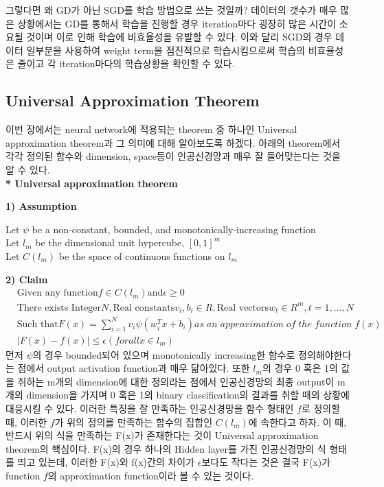 \documentclass[draft=false]{oblivoir}
\begin{document}
그렇다면 왜 GD가 아닌 SGD를 학습 방법으로 쓰는 것일까? 데이터의 갯수가 매우 많은 상황에서는 GD를 통해서 학습을 진행할 경우 iteration마다 굉장히 많은 시간이 소요될 것이며 이로 인해 학습에 비효율성을 유발할 수 있다. 이와 달리 SGD의 경우 데이터 일부분을 사용하여 weight term을 점진적으로 학습시킴으로써 학습의 비효율성은 줄이고 각 iteration마다의 학습상황을 확인할 수 있다.

\subsection{Universal Approximation Theorem}
이번 장에서는 neural network에 적용되는 theorem 중 하나인 Universal approximation theorem과 그 의미에 대해 알아보도록 하겠다. 아래의 theorem에서 각각 정의된 함수와 dimension, space등이 인공신경망과 매우 잘 들어맞는다는 것을 알 수 있다.\\


\textbf{* Universal approximation theorem}

\textbf{1) Assumption}
\begin{center}
Let $\psi$ be a non-constant, bounded, and monotonically-increasing function\\
Let $l_{m}$ be the dimensional unit hypercube, $[0,1]^{m}$\\
Let $C(l_{m})$ be the space of continuous functions on $l_{m}$
\end{center}

\textbf{2) Claim}
\begin{eqnarray*}
& \text{Given any function} f \in C(l_{m}) \text{and} \epsilon \geq 0\\
& \text{There exists Integer} N, \text{Real constants} v_{i},b_{i} \in R, \text{Real vectors} w_{t} \in R^{m}, t = 1,...,N\\
& \text{Such that} F(x) = \sum^{N}_{i=1}v_{i}\psi(w^{T}_{i}x+b_{i}) as\;an \;approximation\; of\; the \;function \;f(x)\\
&|F(x) - f(x)| \leq \epsilon (for all x \in l_{m})
\end{eqnarray*}
먼저 $\psi$의 경우 bounded되어 있으며 monotonically increasing한 함수로 정의해야한다는 점에서 output activation function과 매우 닮아있다. 또한 $l_{m}$의 경우 0 혹은 1의 값을 취하는 m개의 dimension에 대한 정의라는 점에서 인공신경망의 최종 output이 m개의 dimension을 가지며 0 혹은 1의 binary classification의 결과를 취할 때의 상황에 대응시킬 수 있다.  
이러한 특징을 잘 만족하는 인공신경망을 함수 형태인 $f$로 정의할 때, 이러한 $f$가 위의 정의를 만족하는 함수의 집합인 $C(l_{m})$에 속한다고 하자. 이 때, 반드시 위의 식을 만족하는 F(x)가 존재한다는 것이 Universal approximation theorem의 핵심이다. F(x)의 경우 하나의 Hidden layer를 가진 인공신경망의 식 형태를 띄고 있는데, 이러한 F(x)와 f(x)간의 차이가 $\epsilon$보다도 작다는 것은 결국 F(x)가 function $f$의 approximation function이라 볼 수 있는 것이다. 
\end{document}
